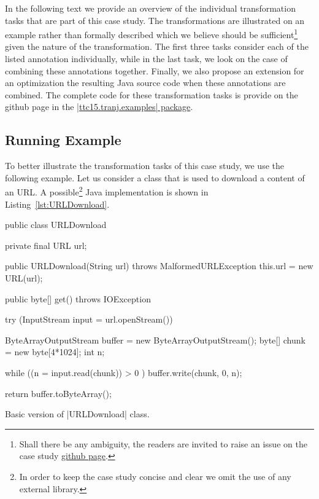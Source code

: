 In the following text we provide an overview of the individual transformation tasks that are part of this case study.
The transformations are illustrated on an example rather than formally described which we believe should be sufficient\footnote{Shall there be any ambiguity, the readers are invited to raise an issue on the case study \href{https://github.com/fikovnik/ttc15-tranj-case}{github page}.} given the nature of the transformation.
The first three tasks consider each of the listed annotation individually, while in the last task, we look on the case of combining these annotations together.
Finally, we also propose an extension for an optimization the resulting Java source code when these annotations are combined.
%
The complete code for these transformation tasks is provide on the github page in the \href{https://github.com/fikovnik/ttc15-tranj-case/tree/master/src/ttc15-tranj/src/main/java/ttc15/tranj/examples}{\javainline|ttc15.tranj.examples| package}.

\subsection{Running Example}

To better illustrate the transformation tasks of this case study, we use the following example.
Let us consider a class that is used to download a content of an URL.
A possible\footnote{In order to keep the case study concise and clear we omit the use of any external library.} Java implementation is shown in Listing~\ref{lst:URLDownload}.

\begin{listing}[H]
  \begin{javacode}
  public class URLDownload {
    private final URL url;

    public URLDownload(String url) throws MalformedURLException {
      this.url = new URL(url);
    }

    public byte[] get() throws IOException {
      try (InputStream input = url.openStream()) {

        ByteArrayOutputStream buffer = new ByteArrayOutputStream();
        byte[] chunk = new byte[4*1024];
        int n;

        while ((n = input.read(chunk)) > 0 ) {
          buffer.write(chunk, 0, n);
        }

        return buffer.toByteArray();
      }
    }
  }
  \end{javacode}
  \caption{Basic version of \javainline|URLDownload| class.}
  \label{lst:URLDownload}
\end{listing}


